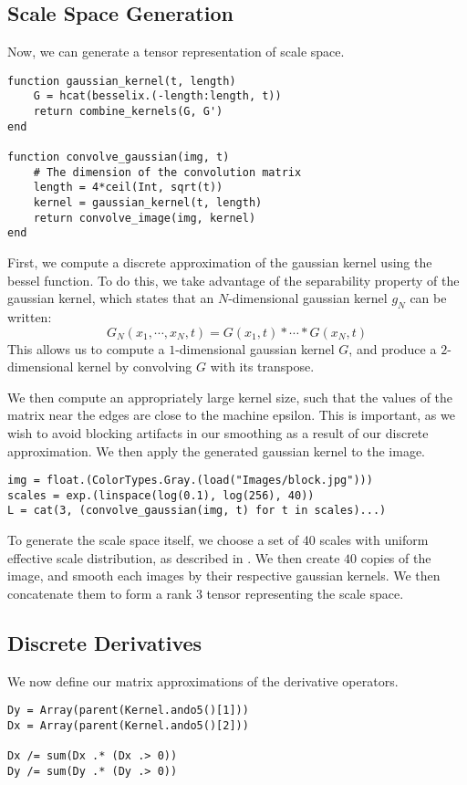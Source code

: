 \documentclass{article}
\begin{document}
\subsection{Scale Space Generation}

Now, we can generate a tensor representation of scale space.
\begin{lstlisting}
function gaussian_kernel(t, length)
    G = hcat(besselix.(-length:length, t))
    return combine_kernels(G, G')
end

function convolve_gaussian(img, t)
    # The dimension of the convolution matrix
    length = 4*ceil(Int, sqrt(t))
    kernel = gaussian_kernel(t, length)
    return convolve_image(img, kernel)
end
\end{lstlisting}

First, we compute a discrete approximation of the gaussian kernel using the bessel function.
To do this, we take advantage of the separability property of the gaussian kernel, which states that an $N$-dimensional gaussian kernel $g_N$ can be written:
\[G_N(x_1, \cdots, x_N, t) = G(x_1, t) * \cdots * G(x_N, t)\]
This allows us to compute a $1$-dimensional gaussian kernel $G$, and produce a $2$-dimensional kernel by convolving $G$ with its transpose.

We then compute an appropriately large kernel size, such that the values of the matrix near the edges are close to the machine epsilon.
This is important, as we wish to avoid blocking artifacts in our smoothing as a result of our discrete approximation.
We then apply the generated gaussian kernel to the image.
\begin{lstlisting}
img = float.(ColorTypes.Gray.(load("Images/block.jpg")))
scales = exp.(linspace(log(0.1), log(256), 40))
L = cat(3, (convolve_gaussian(img, t) for t in scales)...)
\end{lstlisting}

To generate the scale space itself, we choose a set of 40 scales with uniform effective scale distribution, as described in \cite{Lindeberg1993b}.
We then create $40$ copies of the image, and smooth each images by their respective gaussian kernels.
We then concatenate them to form a rank $3$ tensor representing the scale space.

\subsection{Discrete Derivatives}
We now define our matrix approximations of the derivative operators.
\begin{lstlisting}
Dy = Array(parent(Kernel.ando5()[1]))
Dx = Array(parent(Kernel.ando5()[2]))

Dx /= sum(Dx .* (Dx .> 0))
Dy /= sum(Dy .* (Dy .> 0))
\end{lstlisting}
\end{document}
